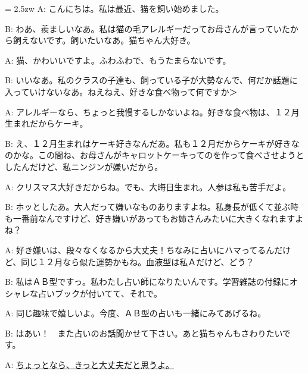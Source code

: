 \documentclass[11pt]{amsart}
\title{}
\author{}
\newenvironment{hangall}[1]{\hangindent = 2.5zw\everypar{\hangindent = 2.5zw}}{}
\begin{document}
\maketitle
\begin{hangall}{}%
A: こんにちは。私は最近、猫を飼い始めました。

B: わあ、羨ましいなあ。私は猫の毛アレルギーだってお母さんが言っていたから飼えないです。飼いたいなあ。猫ちゃん大好き。

A: 猫、かわいいですよ。ふわふわで、もうたまらないです。

B: いいなあ。私のクラスの子達も、飼っている子が大勢なんで、何だか話題に入っていけないなあ。ねえねえ、好きな食べ物って何ですか＞

A: アレルギーなら、ちょっと我慢するしかないよね。好きな食べ物は、１２月生まれだからケーキ。

B: え、１２月生まれはケーキ好きなんだあ。私も１２月だからケーキが好きなのかな。この間ね、お母さんがキャロットケーキってのを作って食べさせようとしたんだけど、私ニンジンが嫌いだから。

A: クリスマス大好きだからね。でも、大晦日生まれ。人参は私も苦手だよ。

B: ホッとしたあ。大人だって嫌いなものありますよね。私身長が低くて並ぶ時も一番前なんですけど、好き嫌いがあってもお姉さんみたいに大きくなれますよね？

A: 好き嫌いは、段々なくなるから大丈夫！ちなみに占いにハマってるんだけど、同じ１２月なら似た運勢かもね。血液型は私Ａだけど、どう？

B: 私はＡＢ型ですっ。私わたし占い師になりたいんです。学習雑誌の付録にオシャレな占いブックが付いてて、それで。

A: 同じ趣味で嬉しいよ。今度、ＡＢ型の占いも一緒にみてあげるね。

B: はあい！　また占いのお話聞かせて下さい。あと猫ちゃんもさわりたいです。

A: \ul{ちょっとなら、きっと大丈夫だと思うよ。}\end{hangall}
\end{document}
